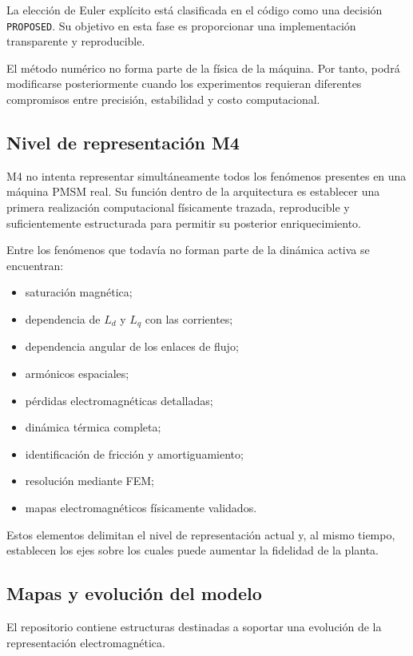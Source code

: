 La elección de Euler explícito está clasificada en el código como una decisión \texttt{PROPOSED}. Su objetivo en esta fase es proporcionar una implementación transparente y reproducible.

El método numérico no forma parte de la física de la máquina. Por tanto, podrá modificarse posteriormente cuando los experimentos requieran diferentes compromisos entre precisión, estabilidad y costo computacional.

\subsection{Nivel de representación M4}

M4 no intenta representar simultáneamente todos los fenómenos presentes en una máquina PMSM real. Su función dentro de la arquitectura es establecer una primera realización computacional físicamente trazada, reproducible y suficientemente estructurada para permitir su posterior enriquecimiento.

Entre los fenómenos que todavía no forman parte de la dinámica activa se encuentran:

\begin{itemize}
\item saturación magnética;
\item dependencia de $L_d$ y $L_q$ con las corrientes;
\item dependencia angular de los enlaces de flujo;
\item armónicos espaciales;
\item pérdidas electromagnéticas detalladas;
\item dinámica térmica completa;
\item identificación de fricción y amortiguamiento;
\item resolución mediante FEM;
\item mapas electromagnéticos físicamente validados.
\end{itemize}

Estos elementos delimitan el nivel de representación actual y, al mismo tiempo, establecen los ejes sobre los cuales puede aumentar la fidelidad de la planta.

\subsection{Mapas y evolución del modelo}

El repositorio contiene estructuras destinadas a soportar una evolución de la representación electromagnética.

